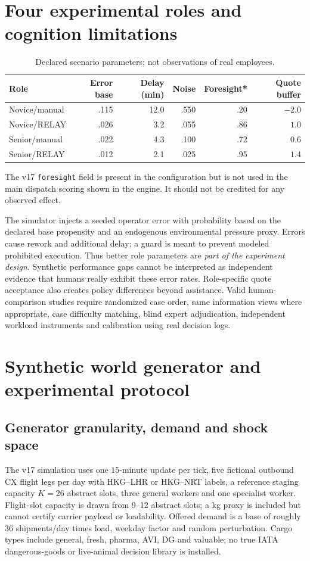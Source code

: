 \documentclass[10pt,a4paper]{article}
\theoremstyle{definition}\newtheorem{definition}[theorem]{Definition}
\theoremstyle{remark}\newtheorem{remark}[theorem]{Remark}
\newcommand{\1}{\mathbbm 1}
\begin{document}
\section{Four experimental roles and cognition limitations}
\begin{table}[htbp]\centering\small
\caption{Declared scenario parameters; not observations of real employees.}\begin{tabular}{@{}lrrrrr@{}}\toprule
Role & Error base & Delay (min) & Noise & Foresight* & Quote buffer\\\midrule
Novice/manual & .115 & 12.0 & .550 & .20 & $-2.0$\\
Novice/RELAY & .026 & 3.2 & .055 & .86 & $1.0$\\
Senior/manual & .022 & 4.3 & .100 & .72 & $0.6$\\
Senior/RELAY & .012 & 2.1 & .025 & .95 & $1.4$\\\bottomrule
\end{tabular}\par\footnotesize *The v17 \texttt{foresight} field is present in the configuration but is not used in the main dispatch scoring shown in the engine. It should not be credited for any observed effect.\end{table}

The simulator injects a seeded operator error with probability based on the declared base propensity and an endogenous environmental pressure proxy. Errors cause rework and additional delay; a guard is meant to prevent modeled prohibited execution. Thus better role parameters are \emph{part of the experiment design}. Synthetic performance gaps cannot be interpreted as independent evidence that humans really exhibit these error rates. Role-specific quote acceptance also creates policy differences beyond assistance. Valid human-comparison studies require randomized case order, same information views where appropriate, case difficulty matching, blind expert adjudication, independent workload instruments and calibration using real decision logs.

\section{Synthetic world generator and experimental protocol}
\subsection{Generator granularity, demand and shock space}
The v17 simulation uses one $15$-minute update per tick, five fictional outbound CX flight legs per day with HKG--LHR or HKG--NRT labels, a reference staging capacity $K=26$ abstract slots, three general workers and one specialist worker. Flight-slot capacity is drawn from 9--12 abstract slots; a kg proxy is included but cannot certify carrier payload or loadability. Offered demand is a base of roughly 36 shipments/day times load, weekday factor and random perturbation. Cargo types include general, fresh, pharma, AVI, DG and valuable; no true IATA dangerous-goods or live-animal decision library is installed.
\end{document}
